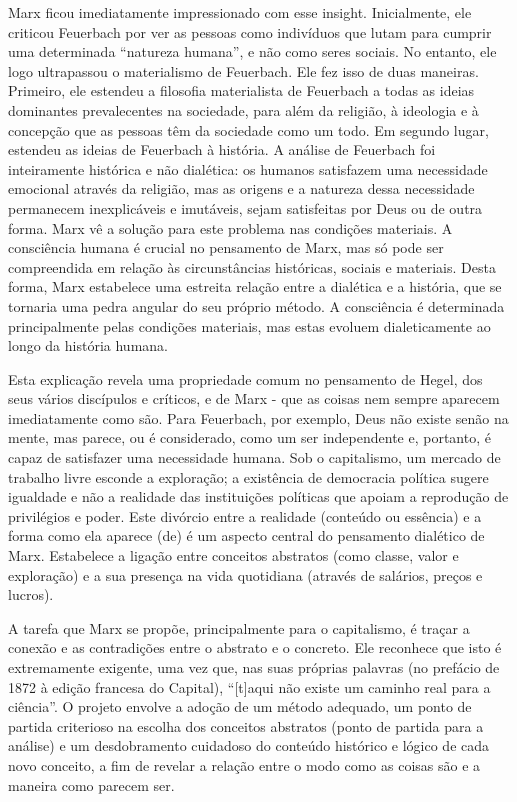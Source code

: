  \par 
Marx ficou imediatamente impressionado com esse insight. Inicialmente, ele criticou Feuerbach por ver as pessoas como indivíduos que lutam para cumprir uma determinada “natureza humana”, e não como seres sociais. No entanto, ele logo ultrapassou o materialismo de Feuerbach. Ele fez isso de duas maneiras. Primeiro, ele estendeu a filosofia materialista de Feuerbach a todas as ideias dominantes prevalecentes na sociedade, para além da religião, à ideologia e à concepção que as pessoas têm da sociedade como um todo. Em segundo lugar, estendeu as ideias de Feuerbach à história. A análise de Feuerbach foi inteiramente histórica e não dialética: os humanos satisfazem uma necessidade emocional através da religião, mas as origens e a natureza dessa necessidade permanecem inexplicáveis ​​e imutáveis, sejam satisfeitas por Deus ou de outra forma. Marx vê a solução para este problema nas condições materiais. A consciência humana é crucial no pensamento de Marx, mas só pode ser compreendida em relação às circunstâncias históricas, sociais e materiais. Desta forma, Marx estabelece uma estreita relação entre a dialética e a história, que se tornaria uma pedra angular do seu próprio método. A consciência é determinada principalmente pelas condições materiais, mas estas evoluem dialeticamente ao longo da história humana.
 \par 
Esta explicação revela uma propriedade comum no pensamento de Hegel, dos seus vários discípulos e críticos, e de Marx - que as coisas nem sempre aparecem imediatamente como são. Para Feuerbach, por exemplo, Deus não existe senão na mente, mas parece, ou é considerado, como um ser independente e, portanto, é capaz de satisfazer uma necessidade humana. Sob o capitalismo, um mercado de trabalho livre esconde a exploração; a existência de democracia política sugere igualdade e não a realidade das instituições políticas que apoiam a reprodução de privilégios e poder. Este divórcio entre a realidade (conteúdo ou essência) e a forma como ela aparece (de) é um aspecto central do pensamento dialético de Marx. Estabelece a ligação entre conceitos abstratos (como classe, valor e exploração) e a sua presença na vida quotidiana (através de salários, preços e lucros).
 \par 
A tarefa que Marx se propõe, principalmente para o capitalismo, é traçar a conexão e as contradições entre o abstrato e o concreto. Ele reconhece que isto é extremamente exigente, uma vez que, nas suas próprias palavras (no prefácio de 1872 à edição francesa do Capital), “[t]aqui não existe um caminho real para a ciência”. O projeto envolve a adoção de um método adequado, um ponto de partida criterioso na escolha dos conceitos abstratos (ponto de partida para a análise) e um desdobramento cuidadoso do conteúdo histórico e lógico de cada novo conceito, a fim de revelar a relação entre o modo como as coisas são e a maneira como parecem ser.
